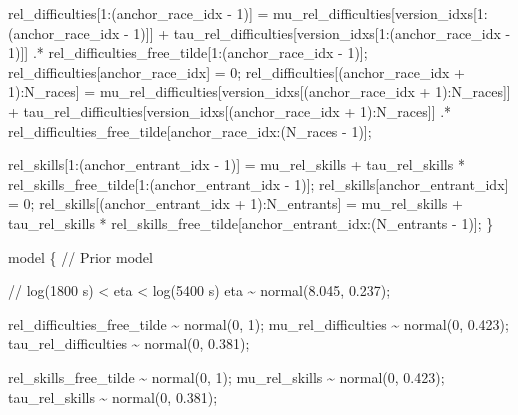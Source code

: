 \documentclass[
  letterpaper,
  DIV=11,
  numbers=noendperiod]{scrartcl}
\newenvironment{Shaded}{\begin{snugshade}}{\end{snugshade}}
\newcommand{\CommentTok}[1]{\textcolor[rgb]{0.37,0.37,0.37}{#1}}
\newcommand{\DecValTok}[1]{\textcolor[rgb]{0.68,0.00,0.00}{#1}}
\newcommand{\FloatTok}[1]{\textcolor[rgb]{0.68,0.00,0.00}{#1}}
\newcommand{\KeywordTok}[1]{\textcolor[rgb]{0.00,0.23,0.31}{#1}}
\newcommand{\NormalTok}[1]{\textcolor[rgb]{0.00,0.23,0.31}{#1}}
\begin{document}
\begin{codelisting}
\begin{Shaded}
\begin{Highlighting}[]
\NormalTok{  rel\_difficulties[}\DecValTok{1}\NormalTok{:(anchor\_race\_idx {-} }\DecValTok{1}\NormalTok{)]}
\NormalTok{    =   mu\_rel\_difficulties[version\_idxs[}\DecValTok{1}\NormalTok{:(anchor\_race\_idx {-} }\DecValTok{1}\NormalTok{)]]}
\NormalTok{      +    tau\_rel\_difficulties[version\_idxs[}\DecValTok{1}\NormalTok{:(anchor\_race\_idx {-} }\DecValTok{1}\NormalTok{)]]}
\NormalTok{        .* rel\_difficulties\_free\_tilde[}\DecValTok{1}\NormalTok{:(anchor\_race\_idx {-} }\DecValTok{1}\NormalTok{)];}
\NormalTok{  rel\_difficulties[anchor\_race\_idx] = }\DecValTok{0}\NormalTok{;}
\NormalTok{  rel\_difficulties[(anchor\_race\_idx + }\DecValTok{1}\NormalTok{):N\_races]}
\NormalTok{    =   mu\_rel\_difficulties[version\_idxs[(anchor\_race\_idx + }\DecValTok{1}\NormalTok{):N\_races]]}
\NormalTok{      +    tau\_rel\_difficulties[version\_idxs[(anchor\_race\_idx + }\DecValTok{1}\NormalTok{):N\_races]]}
\NormalTok{        .* rel\_difficulties\_free\_tilde[anchor\_race\_idx:(N\_races {-} }\DecValTok{1}\NormalTok{)];}

\NormalTok{  rel\_skills[}\DecValTok{1}\NormalTok{:(anchor\_entrant\_idx {-} }\DecValTok{1}\NormalTok{)]}
\NormalTok{    =   mu\_rel\_skills}
\NormalTok{      +   tau\_rel\_skills}
\NormalTok{        * rel\_skills\_free\_tilde[}\DecValTok{1}\NormalTok{:(anchor\_entrant\_idx {-} }\DecValTok{1}\NormalTok{)];}
\NormalTok{  rel\_skills[anchor\_entrant\_idx] = }\DecValTok{0}\NormalTok{;}
\NormalTok{  rel\_skills[(anchor\_entrant\_idx + }\DecValTok{1}\NormalTok{):N\_entrants]}
\NormalTok{    =   mu\_rel\_skills}
\NormalTok{      +   tau\_rel\_skills}
\NormalTok{        * rel\_skills\_free\_tilde[anchor\_entrant\_idx:(N\_entrants {-} }\DecValTok{1}\NormalTok{)];}
\NormalTok{\}}

\KeywordTok{model}\NormalTok{ \{}
  \CommentTok{// Prior model}

  \CommentTok{// log(1800 s) \textless{} eta \textless{} log(5400 s)}
\NormalTok{  eta \textasciitilde{} normal(}\FloatTok{8.045}\NormalTok{, }\FloatTok{0.237}\NormalTok{);}

\NormalTok{  rel\_difficulties\_free\_tilde \textasciitilde{} normal(}\DecValTok{0}\NormalTok{, }\DecValTok{1}\NormalTok{);}
\NormalTok{  mu\_rel\_difficulties \textasciitilde{} normal(}\DecValTok{0}\NormalTok{, }\FloatTok{0.423}\NormalTok{);}
\NormalTok{  tau\_rel\_difficulties \textasciitilde{} normal(}\DecValTok{0}\NormalTok{, }\FloatTok{0.381}\NormalTok{);}

\NormalTok{  rel\_skills\_free\_tilde \textasciitilde{} normal(}\DecValTok{0}\NormalTok{, }\DecValTok{1}\NormalTok{);}
\NormalTok{  mu\_rel\_skills \textasciitilde{} normal(}\DecValTok{0}\NormalTok{, }\FloatTok{0.423}\NormalTok{);}
\NormalTok{  tau\_rel\_skills \textasciitilde{} normal(}\DecValTok{0}\NormalTok{, }\FloatTok{0.381}\NormalTok{);}


\end{Highlighting}
\end{Shaded}
\end{codelisting}
\end{document}

